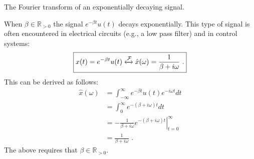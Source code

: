 \begin{marginfigure}
    \begin{center}


    \end{center}
    \caption{The Fourier transform of an exponentially decaying signal.}
\end{marginfigure}

When $\beta \in \mathbb{R}_{>0}$ the signal $e^{-\beta t} u(t)$ decays exponentially.
This type of signal is often encountered in electrical circuits (e.g., a low pass filter) and in control systems:
\begin{equation}
    \boxed{x(t)=e^{-\beta t} u(t) \xleftrightarrow{\mathcal{F}} \hat{x}(\omega)=\frac{1}{\beta + i\omega}\,\,.}
\end{equation}
This can be derived as follows:
\begin{align}
    \hat{x}(\omega) & = \int_{-\infty}^{\infty} e^{-\beta t} u(t) e^{-i\omega t}dt                       \\
                    & = \int_{0}^{\infty} e^{-(\beta+i\omega) t} dt                                      \\
                    & = \left. -\frac{1}{\beta + i\omega} e^{-(\beta + i\omega)t} \right|_{t=0}^{\infty} \\
                    & = \frac{1}{\beta + i\omega}\,\,.
\end{align}
The above requires that $\beta \in \mathbb{R}_{> 0}$.

